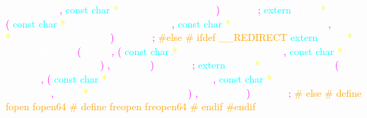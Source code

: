 \textcolor{white}{\_\_filename} 
\textcolor{magenta}{,} 
\textcolor{cyan}{const} 
\textcolor{cyan}{char} 
\textcolor{yellow}{*} 
\textcolor{white}{\_\_restrict} 
\textcolor{white}{\_\_modes} 
\textcolor{magenta}{)} 
\textcolor{white}{\_\_wur} 
\textcolor{magenta}{;} 
\textcolor{cyan}{extern} 
\textcolor{white}{FILE} 
\textcolor{yellow}{*} 
\textcolor{white}{freopen} 
\textcolor{magenta}{(} 
\textcolor{cyan}{const} 
\textcolor{cyan}{char} 
\textcolor{yellow}{*} 
\textcolor{white}{\_\_restrict} 
\textcolor{white}{\_\_filename} 
\textcolor{magenta}{,} 
\textcolor{cyan}{const} 
\textcolor{cyan}{char} 
\textcolor{yellow}{*} 
\textcolor{white}{\_\_restrict} 
\textcolor{white}{\_\_modes} 
\textcolor{magenta}{,} 
\textcolor{white}{FILE} 
\textcolor{yellow}{*} 
\textcolor{white}{\_\_restrict} 
\textcolor{white}{\_\_stream} 
\textcolor{magenta}{)} 
\textcolor{white}{\_\_wur} 
\textcolor{magenta}{;} 
\textcolor{orange}{\#else} 
\textcolor{orange}{\# ifdef \_\_REDIRECT} 
\textcolor{cyan}{extern} 
\textcolor{white}{FILE} 
\textcolor{yellow}{*} 
\textcolor{white}{\_\_REDIRECT} 
\textcolor{magenta}{(} 
\textcolor{white}{fopen} 
\textcolor{magenta}{,} 
\textcolor{magenta}{(} 
\textcolor{cyan}{const} 
\textcolor{cyan}{char} 
\textcolor{yellow}{*} 
\textcolor{white}{\_\_restrict} 
\textcolor{white}{\_\_filename} 
\textcolor{magenta}{,} 
\textcolor{cyan}{const} 
\textcolor{cyan}{char} 
\textcolor{yellow}{*} 
\textcolor{white}{\_\_restrict} 
\textcolor{white}{\_\_modes} 
\textcolor{magenta}{)} 
\textcolor{magenta}{,} 
\textcolor{white}{fopen64} 
\textcolor{magenta}{)} 
\textcolor{white}{\_\_wur} 
\textcolor{magenta}{;} 
\textcolor{cyan}{extern} 
\textcolor{white}{FILE} 
\textcolor{yellow}{*} 
\textcolor{white}{\_\_REDIRECT} 
\textcolor{magenta}{(} 
\textcolor{white}{freopen} 
\textcolor{magenta}{,} 
\textcolor{magenta}{(} 
\textcolor{cyan}{const} 
\textcolor{cyan}{char} 
\textcolor{yellow}{*} 
\textcolor{white}{\_\_restrict} 
\textcolor{white}{\_\_filename} 
\textcolor{magenta}{,} 
\textcolor{cyan}{const} 
\textcolor{cyan}{char} 
\textcolor{yellow}{*} 
\textcolor{white}{\_\_restrict} 
\textcolor{white}{\_\_modes} 
\textcolor{magenta}{,} 
\textcolor{white}{FILE} 
\textcolor{yellow}{*} 
\textcolor{white}{\_\_restrict} 
\textcolor{white}{\_\_stream} 
\textcolor{magenta}{)} 
\textcolor{magenta}{,} 
\textcolor{white}{freopen64} 
\textcolor{magenta}{)} 
\textcolor{white}{\_\_wur} 
\textcolor{magenta}{;} 
\textcolor{orange}{\# else} 
\textcolor{orange}{\# define fopen fopen64} 
\textcolor{orange}{\# define freopen freopen64} 
\textcolor{orange}{\# endif} 
\textcolor{orange}{\#endif} 
